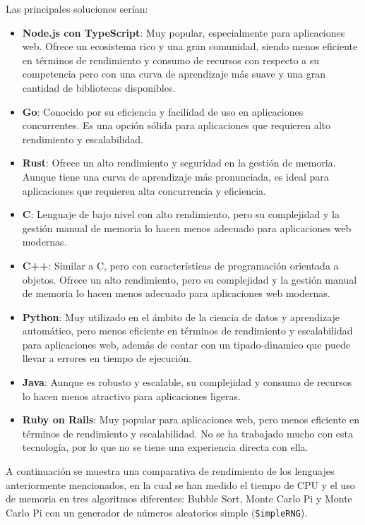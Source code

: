 Las principales soluciones serían:
\begin{itemize}
    \item \textbf{Node.js con TypeScript}: Muy popular, especialmente para aplicaciones web. Ofrece un ecosistema rico y una gran comunidad, siendo menos eficiente en términos de rendimiento y consumo de recursos con respecto a su competencia pero con una curva de aprendizaje más suave y una gran cantidad de bibliotecas disponibles.
    \item \textbf{Go}: Conocido por su eficiencia y facilidad de uso en aplicaciones concurrentes. Es una opción sólida para aplicaciones que requieren alto rendimiento y escalabilidad.
    \item \textbf{Rust}: Ofrece un alto rendimiento y seguridad en la gestión de memoria. Aunque tiene una curva de aprendizaje más pronunciada, es ideal para aplicaciones que requieren alta concurrencia y eficiencia.
    \item \textbf{C}: Lenguaje de bajo nivel con alto rendimiento, pero su complejidad y la gestión manual de memoria lo hacen menos adecuado para aplicaciones web modernas.
    \item \textbf{C++}: Similar a C, pero con características de programación orientada a objetos. Ofrece un alto rendimiento, pero su complejidad y la gestión manual de memoria lo hacen menos adecuado para aplicaciones web modernas.
    \item \textbf{Python}: Muy utilizado en el ámbito de la ciencia de datos y aprendizaje automático, pero menos eficiente en términos de rendimiento y escalabilidad para aplicaciones web, además de contar con un \gls{tipado-dinamico} que puede llevar a errores en tiempo de ejecución.
    \item \textbf{Java}: Aunque es robusto y escalable, su complejidad y consumo de recursos lo hacen menos atractivo para aplicaciones ligeras.
    \item \textbf{Ruby on Rails}: Muy popular para aplicaciones web, pero menos eficiente en términos de rendimiento y escalabilidad. No se ha trabajado mucho con esta tecnología, por lo que no se tiene una experiencia directa con ella.
\end{itemize}

A continuación se muestra una comparativa de rendimiento de los lenguajes anteriormente mencionados, en la cual se han medido el tiempo de CPU y el uso de memoria en tres algoritmos diferentes: Bubble Sort, Monte Carlo Pi y Monte Carlo Pi con un generador de números aleatorios simple (\texttt{SimpleRNG}).

